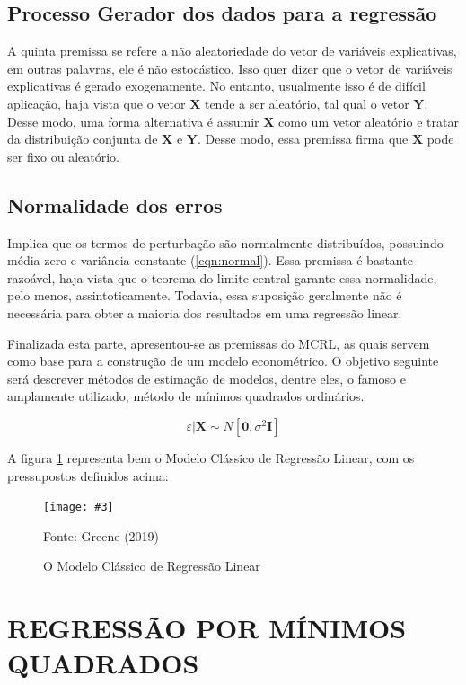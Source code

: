 \documentclass[a4paper,12pt]{article}
\newcommand{\fig}[4]{%
  \begin{figure}[H]
    \centering
    \caption{#1}
    \label{#2}
    \texttt{[image: \#3]}
    
    \vspace{0.5cm}
    
    \begin{footnotesize}
      Fonte: #4
    \end{footnotesize}
  \end{figure}
}
\begin{document}
\hypertarget{processo-gerador-dos-dados-para-a-regressuxe3o}{%
\subsection{Processo Gerador dos dados para a
regressão}\label{processo-gerador-dos-dados-para-a-regressuxe3o}}

A quinta premissa se refere a não aleatoriedade do vetor de variáveis
explicativas, em outras palavras, ele é não estocástico. Isso quer dizer
que o vetor de variáveis explicativas é gerado exogenamente. No entanto,
usualmente isso é de difícil aplicação, haja vista que o vetor
\(\textbf{X}\) tende a ser aleatório, tal qual o vetor \(\textbf{Y}\).
Desse modo, uma forma alternativa é assumir \(\textbf{X}\) como um vetor
aleatório e tratar da distribuição conjunta de \(\textbf{X}\) e
\(\textbf{Y}\). Desse modo, essa premissa firma que \(\textbf{X}\) pode
ser fixo ou aleatório.

\hypertarget{normalidade-dos-erros}{%
\subsection{Normalidade dos erros}\label{normalidade-dos-erros}}

Implica que os termos de perturbação são normalmente distribuídos,
possuindo média zero e variância constante (\ref{eqn:normal}). Essa
premissa é bastante razoável, haja vista que o teorema do limite central
garante essa normalidade, pelo menos, assintoticamente. Todavia, essa
suposição geralmente não é necessária para obter a maioria dos
resultados em uma regressão linear.

Finalizada esta parte, apresentou-se as premissas do MCRL, as quais
servem como base para a construção de um modelo econométrico. O objetivo
seguinte será descrever métodos de estimação de modelos, dentre eles, o
famoso e amplamente utilizado, método de mínimos quadrados ordinários.

\begin{equation}
\label{eqn:normal}
\varepsilon | \textbf{X} \sim N[\textbf{0}, \sigma^2 \textbf{I}]
\end{equation}

A figura \ref{fig:linearmodel} representa bem o Modelo Clássico de
Regressão Linear, com os pressupostos definidos acima:

\fig{O Modelo Clássico de Regressão Linear}{fig:linearmodel}{images/linearModel.png}{Greene (2019)}

\hypertarget{regressuxe3o-por-muxednimos-quadrados}{%
\section{REGRESSÃO POR MÍNIMOS
QUADRADOS}\label{regressuxe3o-por-muxednimos-quadrados}}
\end{document}
